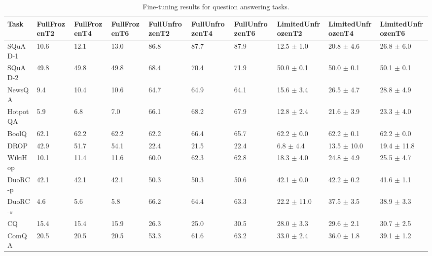 
\begin{table*}[t!]
\centering
\begin{adjustbox}{max width=\textwidth}
 \begin{tabular}{ l  l l l | l l l | l l l}
\toprule
\textbf{Task} & FullFrozenT2 & FullFrozenT4 & FullFrozenT6 & FullUnfrozenT2 & FullUnfrozenT4 & FullUnfrozenT6 & LimitedUnfrozenT2 & LimitedUnfrozenT4 & LimitedUnfrozenT6 \\
\midrule
SQuAD-1 & 10.6 & 12.1 & 13.0 & 86.8 & 87.7 & 87.9 & 12.5 $\pm$ 1.0 & 20.8 $\pm$ 4.6 & 26.8 $\pm$ 6.0\\
SQuAD-2 & 49.8 & 49.8 & 49.8 & 68.4 & 70.4 & 71.9 & 50.0 $\pm$ 0.1 & 50.0 $\pm$ 0.1 & 50.1 $\pm$ 0.1\\
NewsQA & 9.4 & 10.4 & 10.6 & 64.7 & 64.9 & 64.1 & 15.6 $\pm$ 3.4 & 26.5 $\pm$ 4.7 & 28.8 $\pm$ 4.9\\
HotpotQA & 5.9 & 6.8 & 7.0 & 66.1 & 68.2 & 67.9 & 12.8 $\pm$ 2.4 & 21.6 $\pm$ 3.9 & 23.3 $\pm$ 4.0\\
BoolQ & 62.1 & 62.2 & 62.2 & 62.2 & 66.4 & 65.7 & 62.2 $\pm$ 0.0 & 62.2 $\pm$ 0.1 & 62.2 $\pm$ 0.0\\
DROP & 42.9 & 51.7 & 54.1 & 22.4 & 21.5 & 22.4 & 6.8 $\pm$ 4.4 & 13.5 $\pm$ 10.0 & 19.4 $\pm$ 11.8\\
WikiHop & 10.1 & 11.4 & 11.6 & 60.0 & 62.3 & 62.8 & 18.3 $\pm$ 4.0 & 24.8 $\pm$ 4.9 & 25.5 $\pm$ 4.7\\
DuoRC-p & 42.1 & 42.1 & 42.1 & 50.3 & 50.3 & 50.6 & 42.1 $\pm$ 0.0 & 42.2 $\pm$ 0.2 & 41.6 $\pm$ 1.1\\
DuoRC-s & 4.6 & 5.6 & 5.8 & 66.2 & 64.4 & 63.3 & 22.2 $\pm$ 11.0 & 37.5 $\pm$ 3.5 & 38.9 $\pm$ 3.3\\
CQ & 15.4 & 15.4 & 15.9 & 26.3 & 25.0 & 30.5 & 28.0 $\pm$ 3.3 & 29.6 $\pm$ 2.1 & 30.7 $\pm$ 2.5\\
ComQA & 20.5 & 20.5 & 20.5 & 53.3 & 61.6 & 63.2 & 33.0 $\pm$ 2.4 & 36.0 $\pm$ 1.8 & 39.1 $\pm$ 1.2\\
\bottomrule
 \end{tabular}
 \end{adjustbox}
  \caption{Fine-tuning results for question answering tasks.}
  \label{tbla2}
\end{table*}

